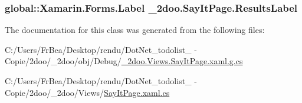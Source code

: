 \hypertarget{class__2doo_1_1_say_it_page_a18bea9e3ec584d60e1b3f97542deb13}{
\subsubsection[{ResultsLabel}]{\setlength{\rightskip}{0pt plus 5cm}global::Xamarin.Forms.Label {\bf \_\-2doo.SayItPage.ResultsLabel}}}
\label{class__2doo_1_1_say_it_page_a18bea9e3ec584d60e1b3f97542deb13}




The documentation for this class was generated from the following files:\begin{CompactItemize}
\item 
C:/Users/FrBea/Desktop/rendu/DotNet\_\-todolist\_ - Copie/2doo/\_\-2doo/obj/Debug/\hyperlink{__2doo_8_views_8_say_it_page_8xaml_8g_8cs}{\_\-2doo.Views.SayItPage.xaml.g.cs}\item 
C:/Users/FrBea/Desktop/rendu/DotNet\_\-todolist\_ - Copie/2doo/\_\-2doo/Views/\hyperlink{_say_it_page_8xaml_8cs}{SayItPage.xaml.cs}\end{CompactItemize}
